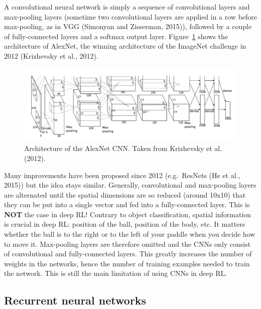 \documentclass[
  letterpaper,
  DIV=11,
  numbers=noendperiod]{scrreprt}
\begin{document}
A convolutional neural network is simply a sequence of convolutional
layers and max-pooling layers (sometime two convolutional layers are
applied in a row before max-pooling, as in VGG (Simonyan and Zisserman,
2015)), followed by a couple of fully-connected layers and a softmax
output layer. Figure~\ref{fig-alexnet} shows the architecture of
AlexNet, the winning architecture of the ImageNet challenge in 2012
(Krizhevsky et al., 2012).

\begin{figure}

{\centering \includegraphics{./img/alexnet.png}

}

\caption{\label{fig-alexnet}Architecture of the AlexNet CNN. Taken from
Krizhevsky et al. (2012).}

\end{figure}

Many improvements have been proposed since 2012 (e.g.~ResNets (He et
al., 2015)) but the idea stays similar. Generally, convolutional and
max-pooling layers are alternated until the spatial dimensions are so
reduced (around 10x10) that they can be put into a single vector and fed
into a fully-connected layer. This is \textbf{NOT} the case in deep RL!
Contrary to object classification, spatial information is crucial in
deep RL: position of the ball, position of the body, etc. It matters
whether the ball is to the right or to the left of your paddle when you
decide how to move it. Max-pooling layers are therefore omitted and the
CNNs only consist of convolutional and fully-connected layers. This
greatly increases the number of weights in the networks, hence the
number of training examples needed to train the network. This is still
the main limitation of using CNNs in deep RL.

\hypertarget{recurrent-neural-networks}{%
\subsection{Recurrent neural networks}\label{recurrent-neural-networks}}
\end{document}
